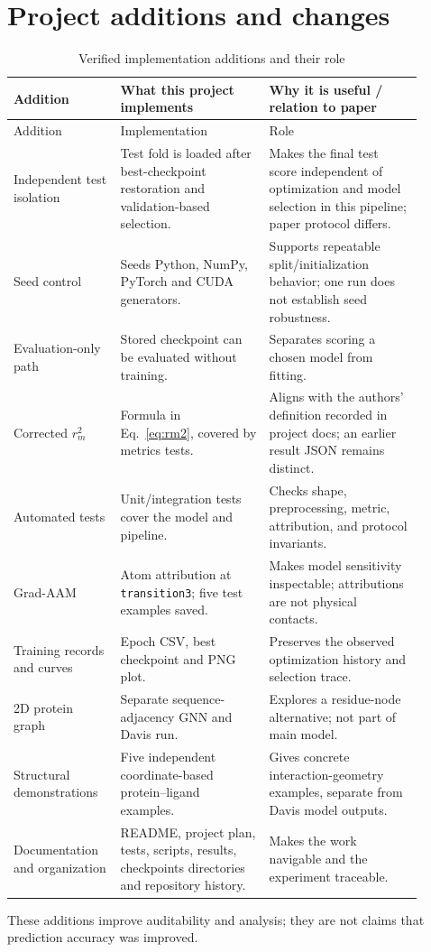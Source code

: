 \section{Project additions and changes}
\begin{longtable}{p{0.23\linewidth}p{0.33\linewidth}p{0.34\linewidth}}\caption{Verified implementation additions and their role}\label{tab:additions}\\\toprule Addition & What this project implements & Why it is useful / relation to paper\\\midrule\endfirsthead\toprule Addition & Implementation & Role\\\midrule\endhead
Independent test isolation & Test fold is loaded after best-checkpoint restoration and validation-based selection. & Makes the final test score independent of optimization and model selection in this pipeline; paper protocol differs.\\
Seed control & Seeds Python, NumPy, PyTorch and CUDA generators. & Supports repeatable split/initialization behavior; one run does not establish seed robustness.\\
Evaluation-only path & Stored checkpoint can be evaluated without training. & Separates scoring a chosen model from fitting.\\
Corrected $r_m^2$ & Formula in Eq.~\ref{eq:rm2}, covered by metrics tests. & Aligns with the authors' definition recorded in project docs; an earlier result JSON remains distinct.\\
Automated tests & Unit/integration tests cover the model and pipeline. & Checks shape, preprocessing, metric, attribution, and protocol invariants.\\
Grad-AAM & Atom attribution at \texttt{transition3}; five test examples saved. & Makes model sensitivity inspectable; attributions are not physical contacts.\\
Training records and curves & Epoch CSV, best checkpoint and PNG plot. & Preserves the observed optimization history and selection trace.\\
2D protein graph & Separate sequence-adjacency GNN and Davis run. & Explores a residue-node alternative; not part of main model.\\
Structural demonstrations & Five independent coordinate-based protein--ligand examples. & Gives concrete interaction-geometry examples, separate from Davis model outputs.\\
Documentation and organization & README, project plan, tests, scripts, results, checkpoints directories and repository history. & Makes the work navigable and the experiment traceable.\\\bottomrule\end{longtable}
These additions improve auditability and analysis; they are not claims that prediction accuracy was improved.
